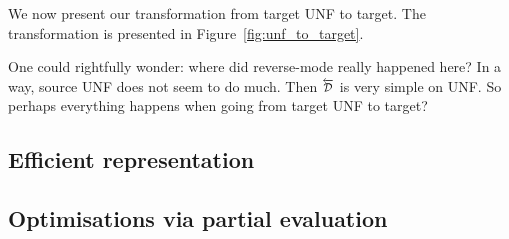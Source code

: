 We now present our transformation from target UNF to target. 
The transformation is presented in Figure~\ref{fig:unf_to_target}.



\begin{remark}
    One could rightfully wonder: where did reverse-mode really happened here?
    In a way, source UNF does not seem to do much. 
    Then $\Dsynrevsymbol$ is very simple on UNF.
    So perhaps everything happens when going from target UNF to target?
\end{remark}

\subsection{Efficient representation}

\subsection{Optimisations via partial evaluation}